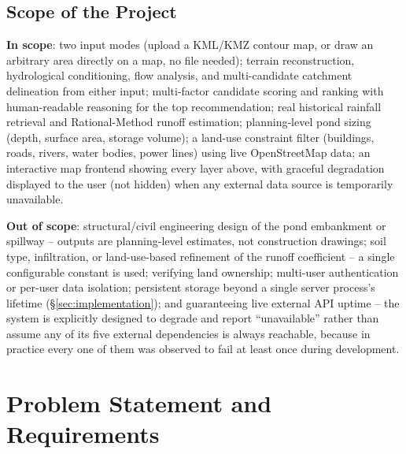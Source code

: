 \documentclass[manuscript,screen]{acmart}
\begin{document}
\subsection{Scope of the Project}
\textbf{In scope}: two input modes (upload a KML/KMZ contour map, or draw
an arbitrary area directly on a map, no file needed); terrain
reconstruction, hydrological conditioning, flow analysis, and
multi-candidate catchment delineation from either input; multi-factor
candidate scoring and ranking with human-readable reasoning for the top
recommendation; real historical rainfall retrieval and Rational-Method
runoff estimation; planning-level pond sizing (depth, surface area,
storage volume); a land-use constraint filter (buildings, roads, rivers,
water bodies, power lines) using live OpenStreetMap data; an interactive
map frontend showing every layer above, with graceful degradation
displayed to the user (not hidden) when any external data source is
temporarily unavailable.

\textbf{Out of scope}: structural/civil engineering design of the pond
embankment or spillway -- outputs are planning-level estimates, not
construction drawings; soil type, infiltration, or land-use-based
refinement of the runoff coefficient -- a single configurable constant is
used; verifying land ownership; multi-user authentication or per-user
data isolation; persistent storage beyond a single server process's
lifetime (\S\ref{sec:implementation}); and guaranteeing live external API
uptime -- the system is explicitly designed to degrade and report
``unavailable'' rather than assume any of its five external dependencies
is always reachable, because in practice every one of them was observed
to fail at least once during development.

\section{Problem Statement and Requirements}
\label{sec:requirements}
\end{document}
